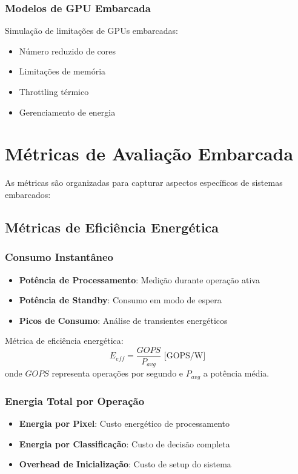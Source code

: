 \subsubsection{Modelos de GPU Embarcada}
Simulação de limitações de GPUs embarcadas:
\begin{itemize}
    \item Número reduzido de cores
    \item Limitações de memória
    \item Throttling térmico
    \item Gerenciamento de energia
\end{itemize}

\section{Métricas de Avaliação Embarcada}\label{sec:metricas_embarcada}

As métricas são organizadas para capturar aspectos específicos de sistemas embarcados:

\subsection{Métricas de Eficiência Energética}

\subsubsection{Consumo Instantâneo}
\begin{itemize}
    \item \textbf{Potência de Processamento}: Medição durante operação ativa
    \item \textbf{Potência de Standby}: Consumo em modo de espera
    \item \textbf{Picos de Consumo}: Análise de transientes energéticos
\end{itemize}

Métrica de eficiência energética:
\begin{equation}
E_{eff} = \frac{GOPS}{P_{avg}} \text{ [GOPS/W]}
\end{equation}
onde $GOPS$ representa operações por segundo e $P_{avg}$ a potência média.

\subsubsection{Energia Total por Operação}
\begin{itemize}
    \item \textbf{Energia por Pixel}: Custo energético de processamento
    \item \textbf{Energia por Classificação}: Custo de decisão completa
    \item \textbf{Overhead de Inicialização}: Custo de setup do sistema
\end{itemize}

